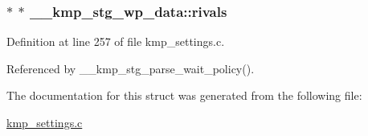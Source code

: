 \hypertarget{struct____kmp__stg__wp__data_aae110667e11fd8e5771c95e2b78b1488}{
\subsubsection[{rivals}]{$\ast$ $\ast$ \-\_\-\-\_\-kmp\-\_\-stg\-\_\-wp\-\_\-data\-::rivals}}\label{struct____kmp__stg__wp__data_aae110667e11fd8e5771c95e2b78b1488}


Definition at line 257 of file kmp\-\_\-settings.\-c.



Referenced by \-\_\-\-\_\-kmp\-\_\-stg\-\_\-parse\-\_\-wait\-\_\-policy().



The documentation for this struct was generated from the following file\-:\begin{DoxyCompactItemize}
\item 
\hyperlink{kmp__settings_8c}{kmp\-\_\-settings.\-c}\end{DoxyCompactItemize}
